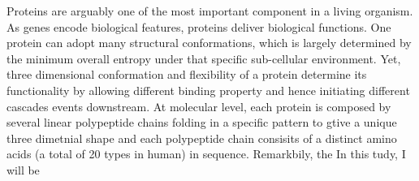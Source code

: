 Proteins are arguably one of the most important component in a living organism. As genes encode biological features, proteins deliver biological functions. One protein can adopt many structural conformations, which is largely determined by the minimum overall entropy under that specific sub-cellular environment. Yet, three dimensional conformation and flexibility of a protein determine its functionality by allowing different binding property and hence initiating different cascades events downstream. At molecular level, each protein is composed by several linear polypeptide chains folding in a specific pattern to gtive a unique three dimetnial shape and each polypeptide chain consisits of a distinct amino acids (a total of 20 types in human) in sequence. Remarkbily, the  In this tudy, I will be 